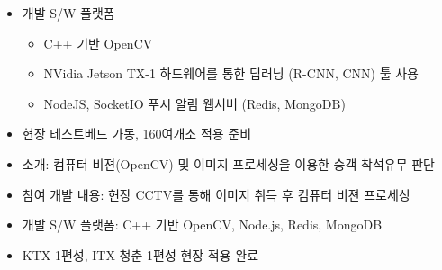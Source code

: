 \documentclass[10pt,a4paper,ragged2e]{altacv}
\begin{document}
\begin{fullwidth}
\begin{itemize}
		\item 개발 S/W 플랫폼
		      \begin{itemize}
			      \item C++ 기반 OpenCV
			      \item NVidia Jetson TX-1 하드웨어를 통한 딥러닝 (R-CNN, CNN) 툴 사용
			      \item NodeJS, SocketIO 푸시 알림 웹서버 (Redis, MongoDB)
		      \end{itemize}
		\item 현장 테스트베드 가동, 160여개소 적용 준비
	\end{itemize}

	\divider


	\begin{itemize}
		\item 소개: 컴퓨터 비젼(OpenCV) 및 이미지 프로세싱을 이용한 승객 착석유무 판단
		\item 참여 개발 내용: 현장 CCTV를 통해 이미지 취득 후 컴퓨터 비젼 프로세싱
		\item 개발 S/W 플랫폼: C++ 기반 OpenCV, Node.js, Redis, MongoDB
		\item KTX 1편성, ITX-청춘 1편성 현장 적용 완료
	\end{itemize}


\end{fullwidth}
\end{document}
